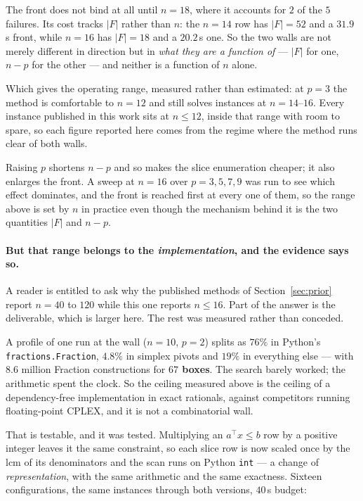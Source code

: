 \documentclass[11pt,a4paper]{article}
\begin{document}
The front does not bind at all until $n=18$, where it accounts for $2$ of the
$5$ failures.  Its cost tracks $|F|$ rather than $n$: the $n=14$ row has
$|F|=52$ and a $31.9$\,s front, while $n=16$ has $|F|=18$ and a $20.2$\,s one.
So the two walls are not merely different in direction but in \emph{what they
are a function of} --- $|F|$ for one, $n-p$ for the other --- and neither is a
function of $n$ alone.

Which gives the operating range, measured rather than estimated: at $p=3$ the
method is comfortable to $n=12$ and still solves instances at $n=14$--$16$.
Every instance published in this work sits at $n \leqslant 12$, inside that
range with room to spare, so each figure reported here comes from the regime
where the method runs clear of both walls.

Raising $p$ shortens $n-p$ and so makes the slice enumeration cheaper; it also
enlarges the front.  A sweep at $n=16$ over $p = 3,5,7,9$ was run to see which
effect dominates, and the front is reached first at every one of them, so the
range above is set by $n$ in practice even though the mechanism behind it is
the two quantities $|F|$ and $n-p$.


\paragraph{But that range belongs to the \emph{implementation}, and the
evidence says so.}
A reader is entitled to ask why the published methods of
Section~\ref{sec:prior} report $n = 40$ to $120$ while this one reports
$n \leqslant 16$.  Part of the answer is the deliverable, which is larger
here.  The rest was measured rather than conceded.

A profile of one run at the wall ($n = 10$, $p = 2$) splits as
$76\%$ in Python's \texttt{fractions.Fraction}, $4.8\%$ in simplex pivots and
$19\%$ in everything else --- with $8.6$ million Fraction constructions for
\textbf{$67$ boxes}.  The search barely worked; the arithmetic spent the clock.
So the ceiling measured above is the ceiling of a dependency-free
implementation in exact rationals, against competitors running floating-point
CPLEX, and it is not a combinatorial wall.

That is testable, and it was tested.  Multiplying an $a^{\top}x \leqslant b$
row by a positive integer leaves it the same constraint, so each slice row is
now scaled once by the lcm of its denominators and the scan runs on Python
\texttt{int} --- a change of \emph{representation}, with the same arithmetic
and the same exactness.  Sixteen configurations, the same instances through
both versions, $40$\,s budget:
\end{document}
